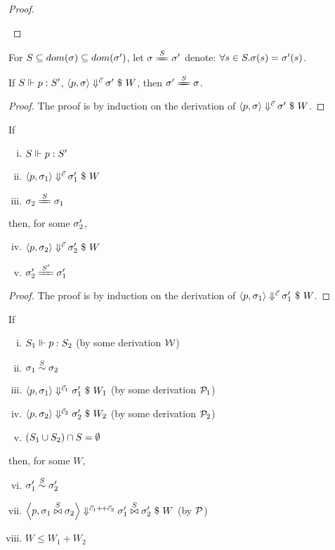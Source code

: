 \begin{proof}
\begin{itemize}
	\end{itemize}
	
\end{proof}

\begin{nota}
	For $\S \subseteq dom(\sigma) \subseteq dom(\sigma')$, let $\sgm \ConEq{\S} \sgm'$ denote: $\forall s \in \S. \sgm(s) = \sgm'(s)$.
\end{nota}

\begin{lem}\label{lem-}
	If $\wf{p}{\S}{\S'}$, $\seval{p}{\sgm}{\c}{\sgm'}{W}$, then $\sgm' \ConEq{\S} \sgm$.
\end{lem}
\begin{proof}
	The proof is by induction on the derivation of $\seval{p}{\sgm}{\c}{\sgm'}{W}$.
\end{proof}


\begin{lem} \label{lem-emp-join}
	If 
	\begin{enumerate} [(i)]
		\item $\wf{p}{\S}{\S'}$
		\item $\seval{p}{\sgm_1}{\c}{\sgm_1'}{W}$
		\item $\sgm_2 \ConEq{S} \sgm_1$
	\end{enumerate}
	then, for some $\sgm_2'$,  
	\begin{enumerate}[(i)]
		\setcounter{enumi}{3}
		\item $\seval{p}{\sgm_2}{\c}{\sgm_2'}{W}$
		\item $\sgm_2' \ConEq{\S'} \sgm_1'$
	\end{enumerate}
\end{lem}
\begin{proof}
	The proof is by induction on the derivation of $\seval{p}{\sgm_1}{\c}{\sgm_1'}{W}$. 
\end{proof}


\begin{lem}  \label{lem-sgm-join}
	If 
	\begin{enumerate}[(i)]
		\item $\wf{p}{\S_1}{\S_2}$ (by some derivation $\MW$)
		\item $\sgm_1 \~{\S} \sgm_2$
		\item $\seval{p}{\sgm_1}{\c_1}{\sgm_1'}{W_1}$ (by some derivation $\MP_1$)
		\item $	\seval{p}{\sgm_2} {\c_2} {\sgm_2'}{W_2}$ (by some derivation $\MP_2$)
		\item $(\S_1 \cup \S_2) \cap \S = \emptyset $
	\end{enumerate}
	then, for some $W$, 
	\begin{enumerate}[(i)]
		\setcounter{enumi}{5}
		\item $\sgm_1' \~\S \sgm_2'$
		\item $\seval{p}{\sgm_1 \x\S \sgm_2}{\c_1 {\++} \c_2}{ \sgm_1' \x\S \sgm_2' }{W}$ (by $\MP$)
		\item $W \le W_1 + W_2$
	\end{enumerate}
\end{lem}

